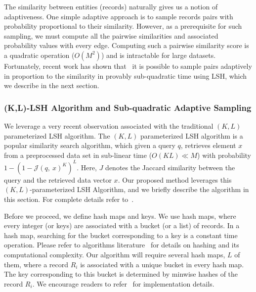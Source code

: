\documentclass[aoas]{imsart}
\begin{document}
The similarity between entities (records) naturally gives us a notion of adaptiveness. One simple adaptive approach is to sample records pairs with probability proportional to their similarity. However, as a prerequisite for such sampling, we must compute all the pairwise similarities and associated probability values with every edge. Computing such a pairwise similarity score is a quadratic operation ($O(M^2)$) and is intractable for large datasets. Fortunately, recent work has shown that~\cite{spring2017scalable,spring2017new,luo2017Arrays} it is possible to sample pairs adaptively in proportion to the similarity in provably sub-quadratic time using LSH, which we describe in the next section.

\subsubsection{(K,L)-LSH Algorithm and Sub-quadratic Adaptive Sampling}
\label{sec:KLParametrizedLSH}

We leverage a very recent observation associated with the traditional $(K, L)$ parameterized LSH algorithm. The $(K, L)$ parameterized LSH algorithm is a popular similarity search algorithm, which given a query $q$, retrieves element $x$ from a preprocessed data set in sub-linear time ($O(KL) \ll M$) with probability $1-(1-\mathcal{J}(q,\ x)^K)^L$.  Here, $J$ denotes the Jaccard similarity between the query and the retrieved data vector $x$. Our proposed method leverages this $(K, L)$-parameterized LSH Algorithm, and we briefly describe the algorithm in this section. For complete details refer to~\cite{Report:E2LSH}.

Before we proceed, we define hash maps and keys. We use hash maps, where every integer (or keys) are associated with a bucket (or a list) of records. In a hash map, searching for the bucket corresponding to a key is a constant time operation. Please refer to algorithms literature~\citep{rajaraman_2012} for details on hashing and its computational complexity. Our algorithm will require several hash maps, $L$ of them, where a record $R_i$ is associated with a unique bucket in every hash map. The key corresponding to this bucket is determined by minwise hashes of the record $R_i$. We encourage readers to refer~\cite{Report:E2LSH} for implementation details.
\end{document}
